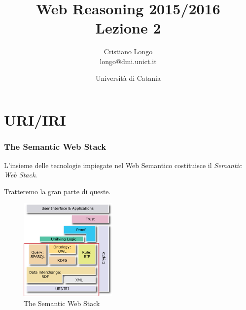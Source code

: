 \documentclass[8pt]{beamer}
\title{Web Reasoning 2015/2016\\
Lezione 2}
\author{Cristiano Longo\\ 
{\small{longo@dmi.unict.it}}}
\date{Universit\`a di Catania}
\begin{document}
\maketitle
\setcounter{tocdepth}{1}

\section{URI/IRI}

% 
% 

\begin{frame}
	\frametitle{The Semantic Web Stack}
	L'insieme delle tecnologie impiegate nel Web Semantico 
	costituisce il \emph{Semantic Web Stack}.
	
	Tratteremo la gran parte di queste.
	
	\begin{figure}
	    \includegraphics[width=180px]{imgs/Semantic_Web_Stack0all.png}
	    \caption{The Semantic Web Stack} 
	\end{figure}
\end{frame}
\end{document}
